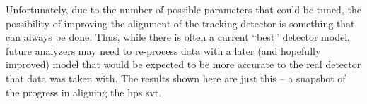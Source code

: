 Unfortunately, due to the number of possible parameters that could be tuned,
the possibility of improving the alignment of the tracking detector is something
that can always be done.
Thus, while there is often a current ``best'' detector model, future analyzers
may need to re-process data with a later (and hopefully improved) model that
would be expected to be more accurate to the real detector that data was taken with.
The results shown here are just this -- a snapshot of the progress in aligning the
\ac{hps} \ac{svt}.
